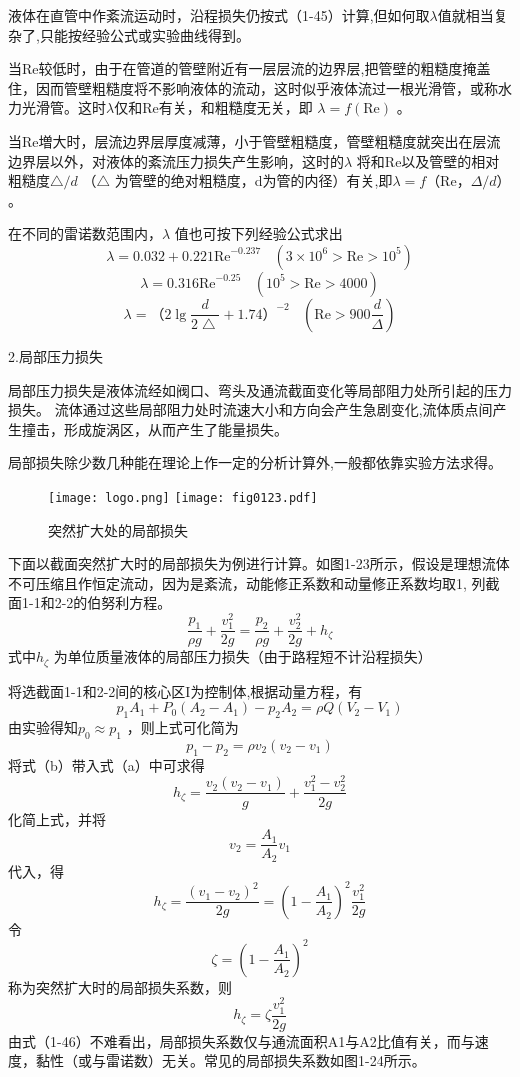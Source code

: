 
液体在直管中作紊流运动时，沿程损失仍按式（1-45）计算,但如何取$ \lambda  $值就相当复杂了,只能按经验公式或实验曲线得到。

当Re较低时，由于在管道的管壁附近有一层层流的边界层,把管壁的粗糙度掩盖住，因而管壁粗糙度将不影响液体的流动，这时似乎液体流过一根光滑管，或称水力光滑管。这时$ \lambda  $仅和Re有关，和粗糙度无关，即 $ \lambda =f\left( \text{Re} \right)  $ 。

当Re増大时，层流边界层厚度减薄，小于管壁粗糙度，管壁粗糙度就突出在层流边界层以外，对液体的紊流压力损失产生影响，这时的$ \lambda  $ 将和Re以及管壁的相对粗糙度$ \bigtriangleup /d $ （$ \bigtriangleup  $ 为管壁的绝对粗糙度，d为管的内径）有关,即$ \lambda =f\text{（Re，}\varDelta /d\text{）} $。

在不同的雷诺数范围内，$ \lambda  $ 值也可按下列经验公式求出
$$ \lambda =0.032+0.221\text{Re}^{-0.237}\ \ \ \ \left( 3\times 10^6>\text{Re}>10^5 \right)  $$ 
$$ \lambda =0.316\text{Re}^{-0.25}\ \ \ \ \left( 10^5>\text{Re}>4000 \right)  $$ 
$$ \lambda =\text{（2}\lg \frac{d}{2\bigtriangleup}+1.74\text{）}^{-2}\ \ \ \ \left( \text{Re}>900\frac{d}{\varDelta} \right)  $$ 

2.局部压力损失

局部压力损失是液体流经如阀口、弯头及通流截面变化等局部阻力处所引起的压力损失。 流体通过这些局部阻力处时流速大小和方向会产生急剧变化,流体质点间产生撞击，形成旋涡区，从而产生了能量损失。

局部损失除少数几种能在理论上作一定的分析计算外,一般都依靠实验方法求得。

\begin{figure}[h]\centering
\ifOpenSource
\texttt{[image: logo.png]}
\else
\texttt{[image: fig0123.pdf]}
\fi
\caption{突然扩大处的局部损失}
\label{fig:fig0123}
\end{figure}

下面以截面突然扩大时的局部损失为例进行计算。如图1-23所示，假设是理想流体不可压缩且作恒定流动，因为是紊流，动能修正系数和动量修正系数均取1, 列截面1-1和2-2的伯努利方程。
$$ \frac{p_1}{\rho g}+\frac{v_{1}^{2}}{2g}=\frac{p_2}{\rho g}+\frac{v_{2}^{2}}{2g}+h_{\zeta} $$ 
式中$ h_{\zeta} $ 为单位质量液体的局部压力损失（由于路程短不计沿程损失）

将选截面1-1和2-2间的核心区I为控制体,根据动量方程，有
$$ p_1A_1+P_0\left( A_2-A_1 \right) -p_2A_2=\rho Q\left( V_2-V_1 \right)  $$
\noindent 由实验得知$ p_0\approx p_1 $ ，则上式可化简为
$$ p_1-p_2=\rho v_2\left( v_2-v_1 \right)  $$ 
\noindent 将式（b）带入式（a）中可求得
$$ h_{\zeta}=\frac{v_2\left( v_2-v_1 \right)}{g}+\frac{v_{1}^{2}-v_{2}^{2}}{2g} $$ 
\noindent 化简上式，并将$$ v_2=\frac{A_1}{A_2}v_1 $$ 代入，得
$$ h_{\zeta}=\frac{\left( v_1-v_2 \right) ^2}{2g}=\left( 1-\frac{A_1}{A_2} \right) ^2\frac{v_{1}^{2}}{2g} $$ 
\noindent 令
$$ \zeta =\left( 1-\frac{A_1}{A_2} \right) ^2 $$ 
\noindent 称为突然扩大时的局部损失系数，则
$$ h_{\zeta}=\zeta \frac{v_{1}^{2}}{2g} $$
由式（1-46）不难看出，局部损失系数仅与通流面积A1与A2比值有关，而与速度，黏性（或与雷诺数）无关。常见的局部损失系数如图1-24所示。

